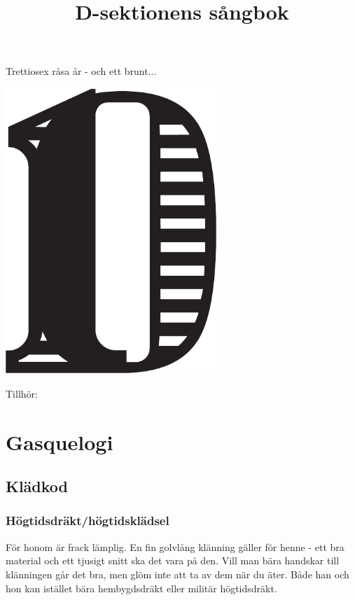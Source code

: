 \documentclass{article}
\title{\fontsize{20}{20} \selectfont D-sektionens sångbok \vspace{-40pt}}
\author{}
\date{}
\renewcommand{\headrulewidth}{0 pt}
\begin{document}
\thispagestyle{empty}
\maketitle
\thispagestyle{empty} %

\begin{center}
Trettiosex råsa år - och ett brunt... 
\end{center}
\vspace{1mm} %



\begin{center}
   \includegraphics[width=0.6\textwidth]{res/D-symbol.pdf}
\end{center}



\newpage
Tillhör:
\newpage
\thispagestyle{plain}
\tableofcontents
\newpage
\thispagestyle{empty}
\section{Gasquelogi}
\subsection{Klädkod}
\subsubsection{Högtidsdräkt/högtidsklädsel}
För honom är frack lämplig. En fin golvlång klänning
gäller för henne - ett bra material och ett tjusigt snitt ska
det vara på den. Vill man bära handskar till klänningen
går det bra, men glöm inte att ta av dem när du äter.
Både han och hon kan istället bära hembygdsdräkt eller
militär högtidsdräkt.
\end{document}
